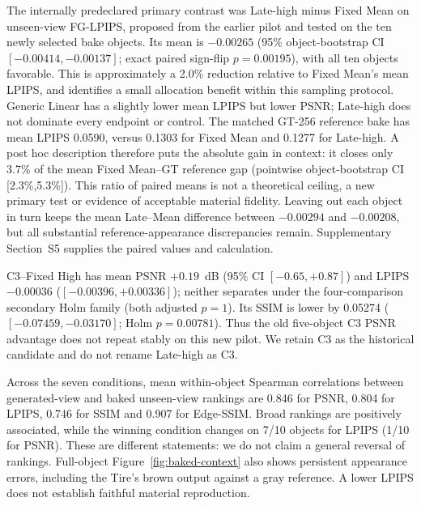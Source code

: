 \documentclass[times,twocolumn,final]{elsarticle}
\begin{document}
The internally predeclared primary contrast was Late-high minus Fixed Mean on unseen-view FG-LPIPS, proposed from the earlier pilot and tested on the ten newly selected bake objects. Its mean is $-0.00265$ (95\% object-bootstrap CI $[-0.00414,-0.00137]$; exact paired sign-flip $p=0.00195$), with all ten objects favorable. This is approximately a 2.0\% reduction relative to Fixed Mean's mean LPIPS, and identifies a small allocation benefit within this sampling protocol. Generic Linear has a slightly lower mean LPIPS but lower PSNR; Late-high does not dominate every endpoint or control. The matched GT-256 reference bake has mean LPIPS 0.0590, versus 0.1303 for Fixed Mean and 0.1277 for Late-high. A post hoc description therefore puts the absolute gain in context: it closes only 3.7\% of the mean Fixed Mean--GT reference gap (pointwise object-bootstrap CI [2.3\%,5.3\%]). This ratio of paired means is not a theoretical ceiling, a new primary test or evidence of acceptable material fidelity. Leaving out each object in turn keeps the mean Late--Mean difference between $-0.00294$ and $-0.00208$, but all substantial reference-appearance discrepancies remain. Supplementary Section~S5 supplies the paired values and calculation.

C3--Fixed High has mean PSNR $+0.19$~dB (95\% CI $[-0.65,+0.87]$) and LPIPS $-0.00036$ ($[-0.00396,+0.00336]$); neither separates under the four-comparison secondary Holm family (both adjusted $p=1$). Its SSIM is lower by 0.05274 ($[-0.07459,-0.03170]$; Holm $p=0.00781$). Thus the old five-object C3 PSNR advantage does not repeat stably on this new pilot. We retain C3 as the historical candidate and do not rename Late-high as C3.

Across the seven conditions, mean within-object Spearman correlations between generated-view and baked unseen-view rankings are 0.846 for PSNR, 0.804 for LPIPS, 0.746 for SSIM and 0.907 for Edge-SSIM. Broad rankings are positively associated, while the winning condition changes on 7/10 objects for LPIPS (1/10 for PSNR). These are different statements: we do not claim a general reversal of rankings. Full-object Figure~\ref{fig:baked-context} also shows persistent appearance errors, including the Tire's brown output against a gray reference. A lower LPIPS does not establish faithful material reproduction.
\end{document}
